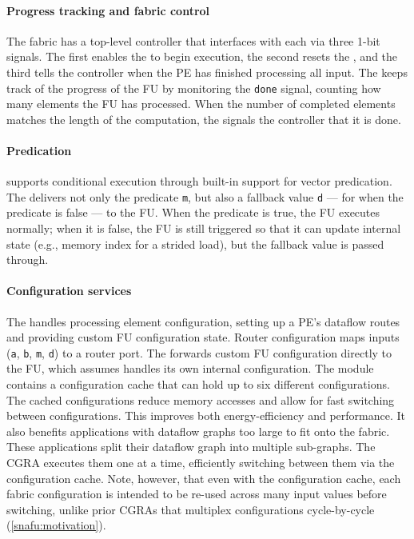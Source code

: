 \paragraph{Progress tracking and fabric control}
The fabric has a top-level controller that interfaces with each \ucore via three 1-bit signals.
% 
The first enables the \ucore to begin execution, the second resets the \ucore, and the third tells the controller when the PE has finished processing all input.
% 
The \ucore keeps track of the progress of the FU by monitoring the {\tt done} signal,
%
counting how many elements the FU has processed.
% 
When the number of completed elements matches the length of the computation, the \ucore signals the controller that it is done.

\paragraph{Predication}
\snafuframe supports conditional execution through built-in support for vector predication.
% 
The \ucore delivers not only the predicate {\tt m}, but also a fallback value {\tt d} --- for when the predicate is false --- to the FU.
% 
When the predicate is true, the FU executes normally; when it is false, the FU is still triggered so that it can update internal state (e.g., memory index for a strided load), but the fallback value is passed through.

\paragraph{Configuration services}
\label{snafu:flexible:config}
The \ucfg handles processing element configuration, setting up a PE's dataflow
routes and providing custom FU configuration state.
%
Router configuration maps inputs ({\tt a}, {\tt b}, {\tt m}, {\tt d}) to a router port.
%
The \ucfg forwards custom FU configuration directly to the FU, which
\snafuframe assumes handles its own internal configuration.
% 
The \ucfg module contains a configuration cache that can hold up to six different configurations.
%
The cached configurations reduce memory accesses and allow for fast switching between configurations.
% 
This improves both energy-efficiency and performance. %
% 
It also benefits applications with dataflow graphs too large to fit onto the fabric.
% 
These applications split their dataflow graph into multiple sub-graphs.
% 
The CGRA executes them one at a time, efficiently switching between them via the configuration cache.
%
Note, however, that even with the configuration cache, each fabric configuration is intended to be re-used across many input values before switching,
unlike prior CGRAs that multiplex configurations cycle-by-cycle (\autoref{snafu:motivation}).


